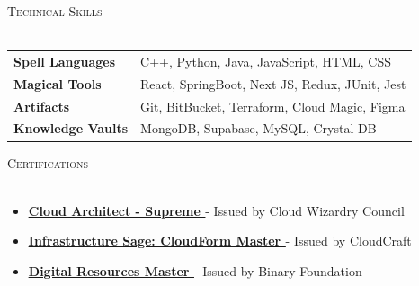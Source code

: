 \documentclass[a4paper,10pt]{article}
\newcommand{\lineunder} {
    \vspace*{-8pt} \\
    \hspace*{-18pt} \hrulefill \\
}
\newcommand{\header} [1] {
    \hspace*{-18pt}\vspace*{6pt} \textsc{#1}
    \vspace*{-6pt} \lineunder
    \vspace{1mm}
}
\newcommand{\techstack}[2]{
    \textbf{#1} & {#2} \\
}
\newcommand{\certification}[3]{
    \item \underline{\textbf{\href{#1}{#2 \faLink}}} - {#3}
}
\begin{document}
\header{Technical Skills}
\begin{tabular}{p{4.8cm}p{15cm}}
\techstack{Spell Languages}{C++, Python, Java, JavaScript, HTML, CSS}
\techstack{Magical Tools}{React, SpringBoot, Next JS, Redux, JUnit, Jest}
\techstack{Artifacts}{Git, BitBucket, Terraform, Cloud Magic, Figma}
\techstack{Knowledge Vaults}{MongoDB, Supabase, MySQL, Crystal DB}
\end{tabular}

\header{Certifications}
\begin{itemize}[leftmargin=*, itemsep=-1pt, topsep=0pt]
\certification{https://www.credly.com/badges/cloud-wizard}{Cloud Architect - Supreme}{Issued by Cloud Wizardry Council}
\certification{https://www.credly.com/badges/infrastructure-sage}{Infrastructure Sage: CloudForm Master}{Issued by CloudCraft}
\certification{https://verify.skilljar.com/digital-master}{Digital Resources Master}{Issued by Binary Foundation}
\end{itemize}
\end{document}
